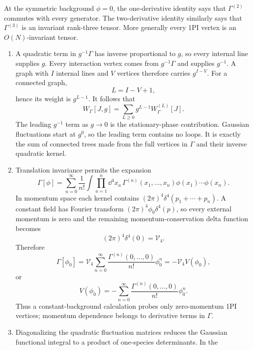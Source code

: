 \begin{enumerate}
\begin{enumerate}
    At the symmetric background \(\phi=0\), the one-derivative identity says
    that \(\Gamma^{(2)}\) commutes with every generator.  The
    two-derivative identity similarly says that \(\Gamma^{(3)}\) is an
    invariant rank-three tensor.  More generally every 1PI vertex is an
    \(O(N)\)-invariant tensor.
  \end{enumerate}

  \begin{enumerate}
    \item[(a)]
    A quadratic term in \(g^{-1}\Gamma\) has inverse proportional to \(g\),
    so every internal line supplies \(g\).  Every interaction vertex comes
    from \(g^{-1}\Gamma\) and supplies \(g^{-1}\).  A graph with \(I\)
    internal lines and \(V\) vertices therefore carries \(g^{I-V}\).
    For a connected graph,
    \[
      L=I-V+1,
    \]
    hence its weight is \(g^{L-1}\).  It follows that
    \[
      W_\Gamma[J,g]
        =\sum_{L\ge0}g^{L-1}W_\Gamma^{(L)}[J].
    \]
    The leading \(g^{-1}\) term as \(g\to0\) is the stationary-phase
    contribution.  Gaussian fluctuations start at \(g^0\), so the leading
    term contains no loops.  It is exactly the sum of connected trees made
    from the full vertices in \(\Gamma\) and their inverse quadratic kernel.
    \item[(b)]
    Translation invariance permits the expansion
    \[
      \Gamma[\phi]
        =\sum_{n=0}^{\infty}\frac1{n!}
         \int\prod_{a=1}^n \dd^4x_a\,
         \Gamma^{(n)}(x_1,\ldots,x_n)
         \phi(x_1)\cdots\phi(x_n).
    \]
    In momentum space each kernel contains
    \((2\pi)^4\delta^4(p_1+\cdots+p_n)\).  A constant field has Fourier
    transform
    \((2\pi)^4\phi_0\delta^4(p)\), so every external momentum is zero and the
    remaining momentum-conservation delta function becomes
    \[
      (2\pi)^4\delta^4(0)=\mathcal V_4.
    \]
    Therefore
    \[
      \Gamma[\phi_0]
        =\mathcal V_4\sum_{n=0}^{\infty}
          \frac{\Gamma^{(n)}(0,\ldots,0)}{n!}\phi_0^n
        =-\mathcal V_4V(\phi_0),
    \]
    or
    \[
      V(\phi_0)
        =-\sum_{n=0}^{\infty}
          \frac{\Gamma^{(n)}(0,\ldots,0)}{n!}\phi_0^n.
    \]
    Thus a constant-background calculation probes only zero-momentum 1PI
    vertices; momentum dependence belongs to derivative terms in
    \(\Gamma\).
    \item[(c)]
    Diagonalizing the quadratic fluctuation matrices reduces the Gaussian
    functional integral to a product of one-species determinants.  In the

\end{enumerate}
\end{enumerate}
